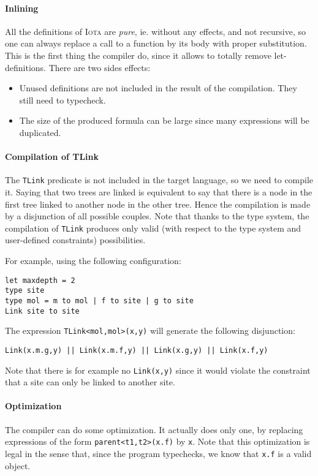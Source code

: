 \documentclass[10pt,a4paper]{article}
\newcommand\Iota{\textsc{Iota}}
\newcommand{\ocaml}{\texttt}
\begin{document}
\paragraph{Inlining}
All the definitions of \Iota{} are \emph{pure}, ie. without any effects, and not recursive, so one can always replace a call to a function by its body with proper substitution. This is the first thing the compiler do, since it allows to totally remove let-definitions. There are two sides effects:

\begin{itemize}
\item Unused definitions are not included in the result of the compilation. They still need to typecheck.
\item The size of the produced formula can be large since many expressions will be duplicated.
\end{itemize}

\paragraph{Compilation of TLink}
\label{para:tlink}
The \ocaml{TLink} predicate is not included in the target language, so we need to compile it.
Saying that two trees are linked is equivalent to say that there is a node in the first tree linked to another node in the other tree. Hence the compilation is made by a disjunction of all possible couples.
Note that thanks to the type system, the compilation of \ocaml{TLink} produces only valid (with respect to the type system and user-defined constraints) possibilities.

For example, using the following configuration:
\begin{verbatim}
let maxdepth = 2
type site
type mol = m to mol | f to site | g to site
Link site to site
\end{verbatim}

The expression \ocaml{TLink<mol,mol>(x,y)} will generate the following disjunction:
\begin{verbatim}
Link(x.m.g,y) || Link(x.m.f,y) || Link(x.g,y) || Link(x.f,y)
\end{verbatim}

Note that there is for example no \ocaml{Link(x,y)} since it would violate the constraint that a site can only be linked to another site.

\paragraph{Optimization}
The compiler can do some optimization. It actually does only one, by replacing expressions of the form
\ocaml{parent<t1,t2>(x.f)} by \ocaml{x}.
Note that this optimization is legal in the sense that, since the program typechecks, we know that \ocaml{x.f} is a valid object.
\end{document}
